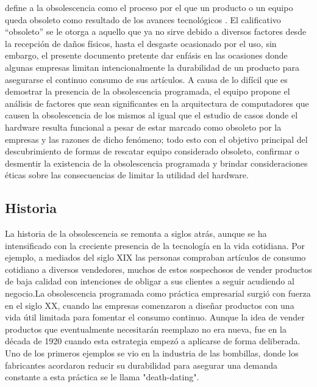 \documentclass[10pt,journal,compsoc]{IEEEtran}
\begin{document}
% 
% 
% 
% 
  define a la obsolescencia como el proceso por el que un producto o un equipo queda obsoleto como resultado de los avances tecnológicos \cite{RAE_obsolescencia}. El calificativo “obsoleto” se le otorga a aquello que ya no sirve
debido a diversos factores desde la recepción de daños físicos, hasta el desgaste ocasionado por el
uso, sin embargo, el presente documento pretente dar enfásis en las ocasiones donde algunas empresas limitan intencionalmente la durabilidad de un producto para asegurarse el continuo consumo de sus artículos.
A causa de lo difícil que es demostrar la presencia de la obsolescencia programada, el equipo
propone el análisis de factores que sean significantes en la arquitectura de computadores que
causen la obsolescencia de los mismos al igual que el estudio de casos donde el hardware resulta
funcional a pesar de estar marcado como obsoleto por la empresas y las razones de dicho fenómeno;
todo esto con el objetivo principal del descubrimiento de formas de rescatar equipo considerado
obsoleto, confirmar o desmentir la existencia de la obsolescencia programada y brindar
consideraciones éticas sobre las consecuencias de limitar la utilidad del hardware.


\subsection{Historia}
La historia de la obsolescencia se remonta a siglos atrás, aunque se ha intensificado con la creciente presencia de la tecnología en la vida cotidiana. Por ejemplo, a mediados del siglo XIX las personas compraban artículos de consumo cotidiano a diversos vendedores, muchos de estos sospechosos de vender productos de baja calidad con intenciones de obligar a sus clientes a seguir acudiendo al negocio\cite{maycroft2009consumption}.La obsolescencia programada como práctica empresarial surgió con fuerza en el siglo XX, cuando las empresas comenzaron a diseñar productos con una vida útil limitada para fomentar el consumo continuo. Aunque la idea de vender productos que eventualmente necesitarán reemplazo no era nueva, fue en la década de 1920 cuando esta estrategia empezó a aplicarse de forma deliberada. Uno de los primeros ejemplos se vio en la industria de las bombillas, donde los fabricantes acordaron reducir su durabilidad para asegurar una demanda constante a esta práctica se le llama "death-dating". 
\end{document}
